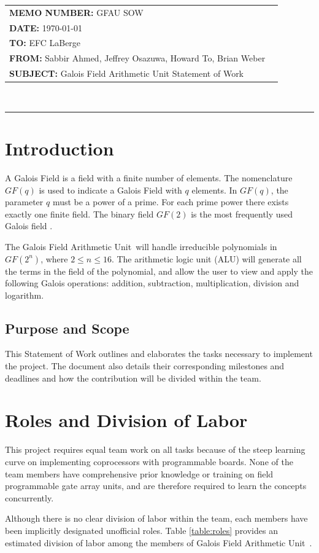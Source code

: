 \documentclass[12pt]{extarticle}
\newcommand{\team}{Galois Field Arithmetic Unit}
\newcommand{\Sabbir}{Sabbir Ahmed}
\newcommand{\Jeffrey}{Jeffrey Osazuwa}
\newcommand{\Howard}{Howard To}
\newcommand{\Brian}{Brian Weber}
\newcommand{\documentinfo}[5]{
    \begin{centering}
        \parbox{6.8in}{
        \begin{spacing}{1}
            \begin{flushleft}
                \begin{tabular}{l l} #1 \\ #2 \\ #3 \\ #4 \\ #5 \\
                \end{tabular}\\
                \rule{\textwidth}{1pt}
            \end{flushleft}
        \end{spacing} }
    \end{centering} }
\begin{document}
    \documentinfo {\textbf{MEMO NUMBER:} GFAU SOW} {\textbf{DATE:} {\today}}
    {\textbf{TO: } EFC LaBerge} {\textbf{FROM: }\Sabbir, \Jeffrey, \Howard,
    \Brian} {\textbf{SUBJECT: } Galois Field Arithmetic Unit Statement of Work}
    \vspace{-0.3in}

    \section{Introduction} A Galois Field is a field with a finite number of
    elements. The nomenclature $GF(q)$ is used to indicate a Galois Field with
    $q$ elements. In $GF(q)$, the parameter $q$ must be a power of a prime. For
    each prime power there exists exactly one finite field. The binary field
    $GF(2)$ is the most frequently used Galois field \cite{wolfdef}.

    The \team~will handle irreducible polynomials in $GF(2^n)$, where $2 \leq
    n \leq 16$. The arithmetic logic unit (ALU) will generate all the terms in
    the field of the polynomial, and allow the user to view and apply the
    following Galois operations: addition, subtraction, multiplication,
    division and logarithm.

        \subsection{Purpose and Scope} This Statement of Work outlines and
        elaborates the tasks necessary to implement the project. The document
        also details their corresponding milestones and deadlines and how the
        contribution will be divided within the team.

    \section{Roles and Division of Labor} This project requires equal team work
    on all tasks because of the steep learning curve on implementing
    coprocessors with programmable boards. None of the team members have
    comprehensive prior knowledge or training on field programmable gate array
    units, and are therefore required to learn the concepts concurrently.

    Although there is no clear division of labor within the team, each members
    have been implicitly designated unofficial roles. Table \ref{table:roles} provides an estimated division of labor among the members of \team~.
\end{document}
